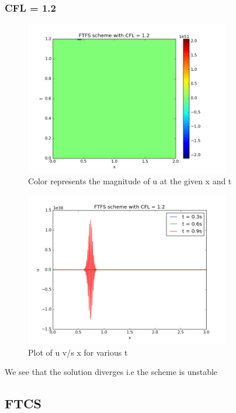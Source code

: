 \documentclass[11pt, a4paper]{article}
\begin{document}
\subsubsection{CFL = 1.2}
\begin{figure}[H]
 \centering
 \includegraphics[width = 0.8\textwidth]{FTFS3_12.png}
 \caption{Color represents the magnitude of u at the given x and t}
\end{figure}

\begin{figure}[H]
 \centering
 \includegraphics[width = 0.8\textwidth]{FTFS3_12_1.png}
 \caption{Plot of u v/s x for various t}
\end{figure}

We see that the solution diverges i.e the scheme is unstable

\subsection{FTCS}
\end{document}

